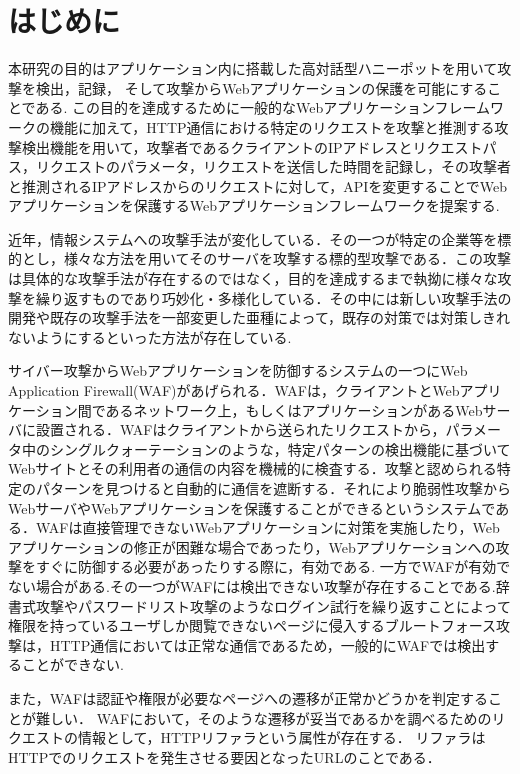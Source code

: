 \documentclass{css}
\begin{document}
\section{はじめに}
本研究の目的はアプリケーション内に搭載した高対話型ハニーポットを用いて攻撃を検出，記録， そして攻撃からWebアプリケーションの保護を可能にすることである.
この目的を達成するために一般的なWebアプリケーションフレームワークの機能に加えて，HTTP通信における特定のリクエストを攻撃と推測する攻撃検出機能を用いて，攻撃者であるクライアントのIPアドレスとリクエストパス，リクエストのパラメータ，リクエストを送信した時間を記録し，その攻撃者と推測されるIPアドレスからのリクエストに対して，APIを変更することでWebアプリケーションを保護するWebアプリケーションフレームワークを提案する.\par
近年，情報システムへの攻撃手法が変化している．その一つが特定の企業等を標的とし，様々な方法を用いてそのサーバを攻撃する標的型攻撃\cite{APT}である．この攻撃は具体的な攻撃手法が存在するのではなく，目的を達成するまで執拗に様々な攻撃を繰り返すものであり巧妙化・多様化している．その中には新しい攻撃手法の開発や既存の攻撃手法を一部変更した亜種によって，既存の対策では対策しきれないようにするといった方法が存在している.\par
サイバー攻撃からWebアプリケーションを防御するシステムの一つにWeb Application Firewall\cite{WAF}(WAF)があげられる．WAFは，クライアントとWebアプリケーション間であるネットワーク上，もしくはアプリケーションがあるWebサーバに設置される．WAFはクライアントから送られたリクエストから，パラメータ中のシングルクォーテーションのような，特定パターンの検出機能に基づいてWebサイトとその利用者の通信の内容を機械的に検査する．攻撃と認められる特定のパターンを見つけると自動的に通信を遮断する．それにより脆弱性攻撃からWebサーバやWebアプリケーションを保護することができるというシステムである．WAFは直接管理できないWebアプリケーションに対策を実施したり，Webアプリケーションの修正が困難な場合であったり，Webアプリケーションへの攻撃をすぐに防御する必要があったりする際に，有効である.
一方でWAFが有効でない場合がある.その一つがWAFには検出できない攻撃が存在することである.辞書式攻撃やパスワードリスト攻撃のようなログイン試行を繰り返すことによって権限を持っているユーザしか閲覧できないページに侵入するブルートフォース攻撃は，HTTP通信においては正常な通信であるため，一般的にWAFでは検出することができない.\par
また，WAFは認証や権限が必要なページへの遷移が正常かどうかを判定することが難しい．
WAFにおいて，そのような遷移が妥当であるかを調べるためのリクエストの情報として，HTTPリファラ\cite{refer}という属性が存在する．
リファラはHTTPでのリクエストを発生させる要因となったURLのことである．
\end{document}
